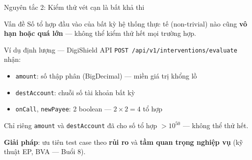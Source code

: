 \documentclass[aspectratio=169,12pt]{beamer}
\begin{document}
\begin{frame}{Nguyên tắc 2: Kiểm thử vét cạn là bất khả thi}
  \begin{block}{Vấn đề}
    Số tổ hợp đầu vào của bất kỳ hệ thống thực tế (non-trivial) nào cũng
    \textbf{vô hạn hoặc quá lớn} --- không thể kiểm thử hết mọi trường hợp.
  \end{block}

  \vspace{0.5em}
  \begin{exampleblock}{Ví dụ định lượng --- DigiShield}
    API \texttt{POST /api/v1/interventions/evaluate} nhận:
    \begin{itemize}
      \item \texttt{amount}: số thập phân (BigDecimal) --- miền giá trị khổng lồ
      \item \texttt{destAccount}: chuỗi số tài khoản bất kỳ
      \item \texttt{onCall}, \texttt{newPayee}: 2 boolean --- $2 \times 2 = 4$ tổ hợp
    \end{itemize}
    Chỉ riêng \texttt{amount} và \texttt{destAccount} đã cho số tổ hợp
    $> 10^{50}$ --- không thể thử hết.
  \end{exampleblock}

  \vspace{0.3em}
  \textbf{Giải pháp}: ưu tiên test case theo \textbf{rủi ro} và
  \textbf{tầm quan trọng nghiệp vụ} (kỹ thuật EP, BVA --- Buổi 8).
\end{frame}
\end{document}
